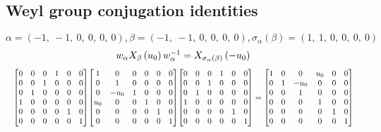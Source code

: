 \documentclass[11pt]{article}
\theoremstyle{definition}
\begin{document}
\subsection{Weyl group conjugation identities}

\providecommand{\scaletoalign}[2]{%
  \sbox0{$#2$}%
  \ifdim\wd0>#1\relax 
    \resizebox{#1}{!}{\usebox0}%
  \else 
    \usebox0%
  \fi 
}
\[
\alpha = \left( -1, \  -1, \  0, \  0, \  0, \  0\right), \beta = \left( -1, \  -1, \  0, \  0, \  0, \  0\right), \sigma_{\alpha}(\beta) = \left( 1, \  1, \  0, \  0, \  0, \  0\right)
\]
\[
\scaletoalign{\textwidth}{w_{\alpha} X_{\beta}\left(u_{0}\right) w_{\alpha}^{-1} = X_{\sigma_{\alpha}\left(\beta\right)}\left(- u_{0}\right)}
\]
\[
\scaletoalign{\textwidth}{{\left[\begin{matrix}0 & 0 & 0 & 1 & 0 & 0\\0 & 0 & 1 & 0 & 0 & 0\\0 & 1 & 0 & 0 & 0 & 0\\1 & 0 & 0 & 0 & 0 & 0\\0 & 0 & 0 & 0 & 1 & 0\\0 & 0 & 0 & 0 & 0 & 1\end{matrix}\right]} {\left[\begin{matrix}1 & 0 & 0 & 0 & 0 & 0\\0 & 1 & 0 & 0 & 0 & 0\\0 & - u_{0} & 1 & 0 & 0 & 0\\u_{0} & 0 & 0 & 1 & 0 & 0\\0 & 0 & 0 & 0 & 1 & 0\\0 & 0 & 0 & 0 & 0 & 1\end{matrix}\right]} {\left[\begin{matrix}0 & 0 & 0 & 1 & 0 & 0\\0 & 0 & 1 & 0 & 0 & 0\\0 & 1 & 0 & 0 & 0 & 0\\1 & 0 & 0 & 0 & 0 & 0\\0 & 0 & 0 & 0 & 1 & 0\\0 & 0 & 0 & 0 & 0 & 1\end{matrix}\right]} = {\left[\begin{matrix}1 & 0 & 0 & u_{0} & 0 & 0\\0 & 1 & - u_{0} & 0 & 0 & 0\\0 & 0 & 1 & 0 & 0 & 0\\0 & 0 & 0 & 1 & 0 & 0\\0 & 0 & 0 & 0 & 1 & 0\\0 & 0 & 0 & 0 & 0 & 1\end{matrix}\right]}}
\]
\end{document}
